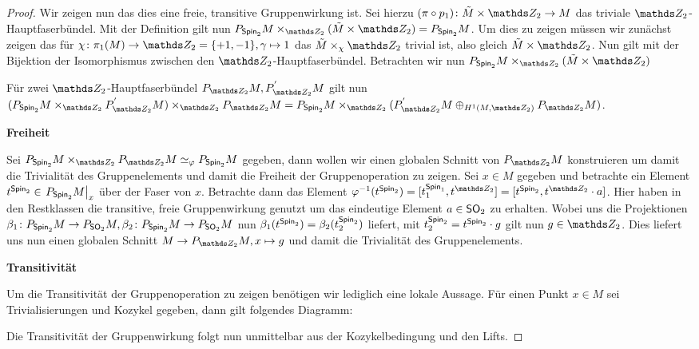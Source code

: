 \begin{Satz}
\begin{proof}
		Wir zeigen nun das dies eine freie, transitive Gruppenwirkung ist. Sei hierzu $ \abb{(\pi\circ p_1)}{\tilde{M}\times \Z_2}{M} $ das triviale $ \Z_2 $-Hauptfaserbündel. Mit der Definition gilt nun
		$ \Ph{\spin_2}{M} \times_{\Z_2} (\tilde{M} \times \Z_2) = \Ph{\spin_2}{M} $. Um dies zu zeigen müssen wir zunächst
		zeigen das für $ \abb{\chi}{\pi_1(M)}{\Z_2 = \{ +1,-1 \}} , \gamma \mapsto 1 $ das $ \tilde{M} \times_\chi \Z_2 $ trivial ist, also gleich $ \tilde{M} \times \Z_2 $. Nun gilt 
		mit der Bijektion 
		der Isomorphismus zwischen den $ \Z_2 $-Hauptfaserbündel.
		Betrachten wir nun $ \Ph{\spin_2}{M} \times_{\Z_2} (\tilde{M} \times \Z_2) $
		
		Für zwei $ \Z_2 $-Hauptfaserbündel $ \Ph{\Z_2}{M},P^{'}_{\Z_2}M $
		gilt nun $ ( \Ph{\spin_2}{M} \times_{\Z_2} P^{'}_{\Z_2}M ) \times_{\Z_2} \Ph{\Z_2}{M} = \Ph{\spin_2}{M} \times_{\Z_2} (P^{'}_{\Z_2}M \oplus_{H^1(M,\Z_2)} \Ph{\Z_2}{M}) $.
		
		\textbf{Freiheit}
		
		Sei $ \Ph{\spin_2}{M} \times_{\Z_2} \Ph{\Z_2}{M} \simeq_\varphi \Ph{\spin_2}{M} $ gegeben, dann wollen wir einen globalen
		Schnitt von $ \Ph{\Z_2}{M} $ konstruieren um damit die 
		Trivialität des Gruppenelements und damit die Freiheit
		der Gruppenoperation zu zeigen.
		Sei $ x\in M $ gegeben und betrachte ein Element $ t^{\operatorname{\mathsf{Spin}}_2} \in \left.P_{\operatorname{\mathsf{Spin}}_2}M\right|_x $ über der Faser von $ x $.
		Betrachte dann das Element $ \varphi^{-1}(t^{\spin_2}) = [t_1^{\spin_1},t^{\Z_2}] = [t^{\spin_2},t^{\Z_2} \cdot a] $.
		Hier haben in den Restklassen die transitive, freie Gruppenwirkung genutzt um das eindeutige Element $ a\in \operatorname{\mathsf{SO}}_2 $
		zu erhalten. Wobei uns die Projektionen $ \beta_1 \colon P_{\operatorname{\mathsf{Spin}}_2}M \rightarrow P_{\operatorname{\mathsf{SO}}_2}M ,\beta_2 \colon P_{\operatorname{\mathsf{Spin}}_2}M \rightarrow P_{\operatorname{\mathsf{SO}}_2}M$
		nun $ \beta_1(t^{\operatorname{\mathsf{Spin}}_2}) = \beta_2(t_2^{\operatorname{\mathsf{Spin}}_2}) $ liefert,
		mit $ t_2^{\operatorname{\mathsf{Spin}}_2} = t^{\operatorname{\mathsf{Spin}}_2} \cdot g $ gilt nun
		$ g \in \Z_2 $. Dies liefert uns nun einen globalen Schnitt
		$ M  \to \Ph{\Z_2}{M} , x \mapsto g$ und damit die 
		Trivialität des Gruppenelements.
		
		\textbf{Transitivität}
		
		Um die Transitivität der Gruppenoperation zu zeigen 
		benötigen wir lediglich eine lokale Aussage.
		Für einen Punkt $ x\in M $ sei Trivialisierungen und
		Kozykel gegeben, dann gilt folgendes Diagramm:
		\begin{center}
		\end{center}
		Die Transitivität der Gruppenwirkung folgt nun unmittelbar
		aus der Kozykelbedingung und den Lifts.
		
	\end{proof}
\end{Satz}

